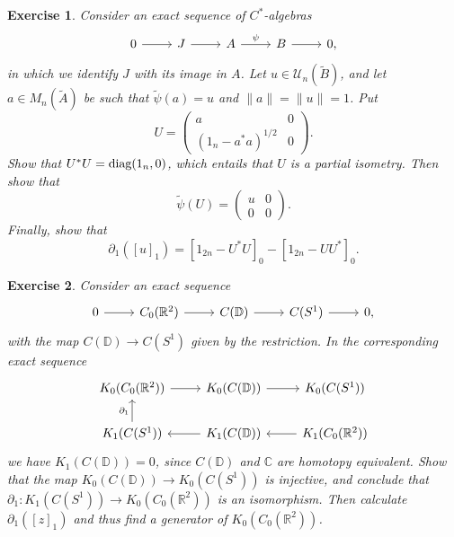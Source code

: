 \documentclass{book}
\newtheorem{exercise}{Exercise}[section]
\def\cstars{\(C^*\)-algebras}
\def\diag{\textnormal{diag}}
\begin{document}
\begin{exercise}\label{ex:7315}
  Consider an exact sequence of \cstars\
  \[
    \begin{tikzcd}
      0\arrow[r]&J \arrow[r]&A\arrow[r,"\psi"]&B\arrow[r]&0,
    \end{tikzcd} 
  \]
  in which we identify \(J\) with its image in \(A\). Let \(u\in\mathcal{U}_n(\tilde{B})\), and let \(a\in M_n(\tilde{A})\) be such that
  \(\tilde{\psi}(a)=u\) and \(\|a\|=\|u\|=1\). Put
  \[
    U=\begin{pmatrix}
      a&0\\
      {(1_n-a^* a)}^{1/2}&0
    \end{pmatrix}.
  \]  
  Show that \(U^* U=\diag(1_n,0)\), which entails that \(U\) is a partial isometry. Then show that
  \[
    \tilde{\psi}(U)=\begin{pmatrix}
      u&0\\0&0
    \end{pmatrix}.
  \]
  Finally, show that 
  \[
    \partial_1({[u]}_1)={[1_{2n}-U^* U]}_0-{[1_{2n}-U U^*]}_0.
  \]
\end{exercise}
\begin{exercise}\label{ex:7316}
  Consider an exact sequence
  \[
    \begin{tikzcd}
      0\arrow[r]&C_0(\mathbb{R}^2) \arrow[r]&C(\mathbb{D})\arrow[r]&C(S^1)\arrow[r]&0,
    \end{tikzcd} 
  \]
  with the map \(C(\mathbb{D})\rightarrow C(S^1)\) given by the restriction. In the corresponding exact sequence
  \begin{equation}\label{seq:7311}
    \begin{tikzcd}
      K_0(C_0(\mathbb{R}^2)) \arrow[r]&K_0(C(\mathbb{D}))\arrow[r]&K_0(C(S^1))\\
      K_1(C(S^1))\arrow[u,"\partial_1"]&K_1(C(\mathbb{D}))\arrow[l]&K_1(C_0(\mathbb{R}^2))\arrow[l]
    \end{tikzcd}  
  \end{equation}
  we have \(K_1(C(\mathbb{D}))=0\), since \(C(\mathbb{D})\) and \(\mathbb{C}\) are homotopy equivalent. Show that the map 
  \(K_0(C(\mathbb{D}))\rightarrow K_0(C(S^1))\) is injective, and conclude that \(\partial_1:K_1(C(S^1))\rightarrow K_0(C_0(\mathbb{R}^2))\) is an isomorphism.
  Then calculate \(\partial_1({[z]}_1)\) and thus find a generator of \(K_0(C_0(\mathbb{R}^2))\).
\end{exercise}
\end{document}
